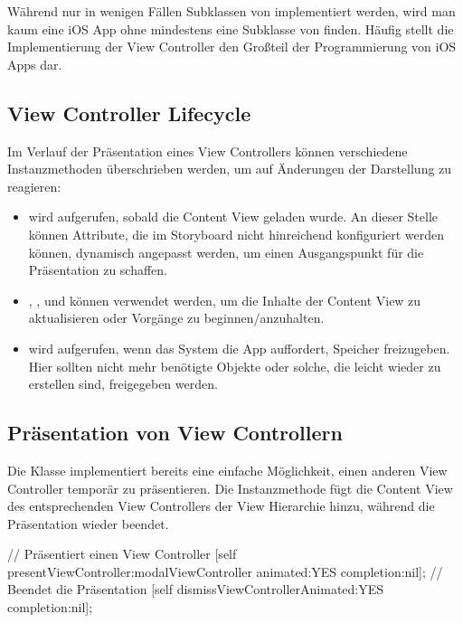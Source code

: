 \documentclass[parskip=half, final]{scrreprt}
\begin{document}
Während nur in wenigen Fällen Subklassen von  implementiert werden, wird man kaum eine iOS App ohne mindestens eine Subklasse von  finden. Häufig stellt die Implementierung der View Controller den Großteil der Programmierung von iOS Apps dar.

\subsection{View Controller Lifecycle}

Im Verlauf der Präsentation eines View Controllers können verschiedene Instanzmethoden überschrieben werden, um auf Änderungen der Darstellung zu reagieren:
\begin{itemize}
\item {} wird aufgerufen, sobald die Content View geladen wurde. An dieser Stelle können Attribute, die im Storyboard nicht hinreichend konfiguriert werden können, dynamisch angepasst werden, um einen Ausgangspunkt für die Präsentation zu schaffen.
\item {}, ,  und  können verwendet werden, um die Inhalte der Content View zu aktualisieren oder Vorgänge zu beginnen/anzuhalten.
\item {} wird aufgerufen, wenn das System die App auffordert, Speicher freizugeben. Hier sollten nicht mehr benötigte Objekte oder solche, die leicht wieder zu erstellen sind, freigegeben werden.
\end{itemize}

\subsection{Präsentation von View Controllern}

Die  Klasse implementiert bereits eine einfache Möglichkeit, einen anderen View Controller temporär zu präsentieren. Die Instanzmethode  fügt die Content View des entsprechenden View Controllers der View Hierarchie hinzu, während  die Präsentation wieder beendet.

\begin{objclst}
// Präsentiert einen View Controller
[self presentViewController:modalViewController animated:YES completion:nil];
// Beendet die Präsentation
[self dismissViewControllerAnimated:YES completion:nil];
\end{objclst}
\end{document}
